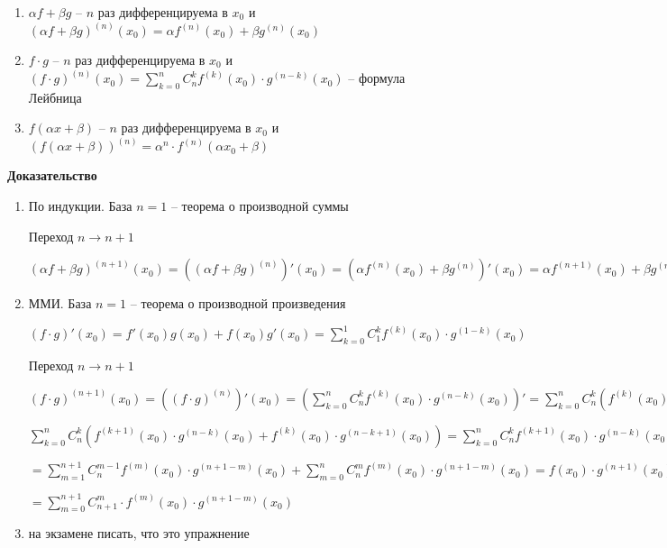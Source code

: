 \documentclass[14pt, letter paper]{article}
\begin{document}
\begin{enumerate}
    \item $\alpha f + \beta g$ -- $n$ раз дифференцируема в $x_0$ и $(\alpha f + \beta g)^{(n)}(x_0) = \alpha f^{(n)}(x_0) + \beta g^{(n)}(x_0)$
    
    \item $f \cdot g$ -- $n$ раз дифференцируема в $x_0$ и $(f \cdot g)^{(n)}(x_0) = \sum\limits_{k = 0}^{n} C_n^k f^{(k)}(x_0) \cdot g^{(n - k)}(x_0)$ -- формула Лейбница
    
    \item $f(\alpha x + \beta)$ -- $n$ раз дифференцируема в $x_0$ и $(f(\alpha x + \beta))^{(n)} = \alpha^n \cdot f^{(n)}(\alpha x_0 + \beta)$
\end{enumerate}

\begin{center}
    \textbf{Доказательство}
\end{center}

\begin{enumerate}
    \item По индукции. База $n = 1$ -- теорема о производной суммы

    Переход $n \rightarrow n + 1$
    
    $(\alpha f + \beta g)^{(n + 1)}(x_0) = ((\alpha f + \beta g)^{(n)})'(x_0) = (\alpha f^{(n)}(x_0) + \beta g^{(n)})'(x_0) = \alpha f^{(n + 1)}(x_0) + \beta g^{(n + 1)}(x_0)$

    \item ММИ. База $n = 1$ -- теорема о производной произведения
    
    $(f \cdot g)'(x_0) = f'(x_0)g(x_0) + f(x_0)g'(x_0) = \sum\limits_{k = 0}^{1} C_1^k f^{(k)}(x_0) \cdot g^{(1 - k)}(x_0)$

    Переход $n \rightarrow n + 1$

    $(f \cdot g)^{(n + 1)}(x_0) = ((f \cdot g)^{(n)})'(x_0) = (\sum\limits_{k = 0}^{n} C_n^k f^{(k)}(x_0) \cdot g^{(n - k)}(x_0))' = \sum\limits_{k = 0}^{n} C_n^k (f^{(k)}(x_0) \cdot g^{(n - k)})'(x_0) =$
    
    $\sum\limits_{k = 0}^{n} C_n^k (f^{(k + 1)}(x_0) \cdot g^{(n - k)}(x_0) + f^{(k)}(x_0) \cdot g^{(n - k + 1)}(x_0)) = \sum\limits_{k = 0}^{n} C_n^k f^{(k + 1)}(x_0) \cdot g^{(n - k)}(x_0) + \sum\limits_{k = 0}^{n} C_n^k f^{(k)}(x_0) \cdot g^{(n - k + 1)}(x_0) =$

    $= \sum\limits_{m = 1}^{n + 1} C_n^{m - 1} f^{(m)}(x_0) \cdot g^{(n + 1 - m)}(x_0) + \sum\limits_{m = 0}^{n} C_n^m f^{(m)}(x_0) \cdot g^{(n + 1 - m)}(x_0) = f(x_0) \cdot g^{(n + 1)}(x_0) + \sum\limits_{m = 1}^{n} C_{n + 1}^m \cdot f^{(m)}(x_0) \cdot g^{(n + 1 - m)}(x_0) + f^{(n + 1)}(x_0) \cdot g(x_0) =$

    $= \sum\limits_{m = 0}^{n + 1} C_{n + 1}^m \cdot f^{(m)}(x_0) \cdot g^{(n + 1 - m)}(x_0)$

    \item на экзамене писать, что это упражнение
\end{enumerate}
\end{document}
